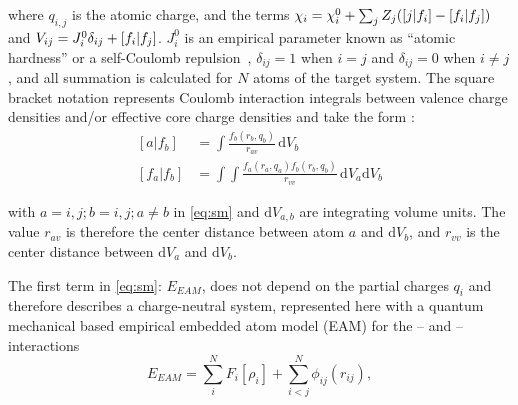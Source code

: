where $q_{i,j}$ is the atomic charge, and the terms $\cramped{\chi_i = \chi_i^0 + \sum_{j}Z_{j}(\left[j|f_i\right]-\left[f_i|f_j\right])}$ and $\cramped{V_{ij} = J_{i}^{0}\delta_{ij}+\left[f_i|f_j\right]}$.
$J_i^0$ is an empirical parameter known as ``atomic hardness'' or a self-Coulomb repulsion~\cite{Rappe1991}, $\delta_{ij} = 1$ when $i=j$ and $\delta_{ij} = 0$ when $i\neq j$, and all summation is calculated for $N$ atoms of the target system.
The square bracket notation represents Coulomb interaction integrals between valence charge densities and/or effective core charge densities and take the form \cite{Zhou2004}:
\begin{align}
\left[a|f_b\right] &= \int \frac{f_b(r_b,q_b)}{r_{av}}\,\mathrm{d}V_b\\
\left[f_a|f_b\right] &= \int\!\!\int \frac{f_a(r_a,q_a)f_b(r_b,q_b)}{r_{vv}}\,\mathrm{d}V_a \mathrm{d}V_b
\end{align}

with $a=i,j; b=i,j; a\neq b$ in \cref{eq:sm} and $\mathrm{d}V_{a,b}$ are integrating volume units.
The value $r_{av}$ is therefore the center distance between atom $a$ and $\mathrm{d}V_b$, and $r_{vv}$ is the center distance between $\mathrm{d}V_a$ and $\mathrm{d}V_b$.

The first term in \cref{eq:sm}: $E_{EAM}$, does not depend on the partial charges $q_i$ and therefore describes a charge-neutral system, represented here with a quantum mechanical based empirical embedded atom model (EAM) for the -- and -- interactions
\begin{equation}
E_{EAM} = \sum_{i}^{N}F_{i}\left[\rho_i\right]+\sum_{i<j}^{N}\phi_{ij}(r_{ij}),\label{eq:smeam}
\end{equation}

